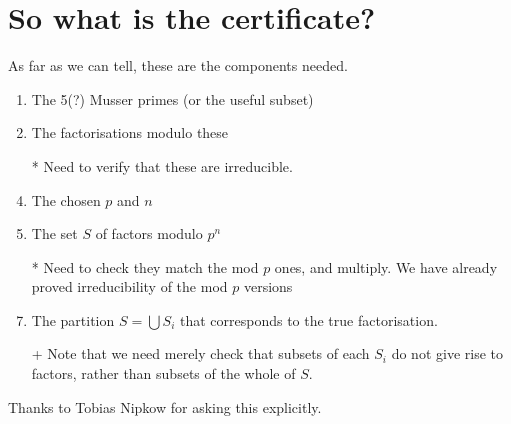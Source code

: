 \documentclass{llncs}
\begin{document}
\section{So what is the certificate?}
As far as we can tell, these are the components needed.
\begin{enumerate}
\item The 5(?) Musser primes (or the useful subset)
\item The factorisations modulo these
\item[*]Need to verify that these are irreducible.
\item The chosen $p$ and $n$
\item The set $S$ of factors modulo $p^n$
\item[*]Need to check they match the mod $p$ ones, and multiply. We have already proved irreducibility of the mod $p$ versions
\item The partition $S=\bigcup S_i$ that corresponds to the true factorisation.
\item[+]Note that we need merely check that subsets of each $S_i$ do not give rise to factors, rather than subsets of the whole of $S$.
\end{enumerate}
Thanks to Tobias Nipkow for asking this explicitly.
\end{document}
